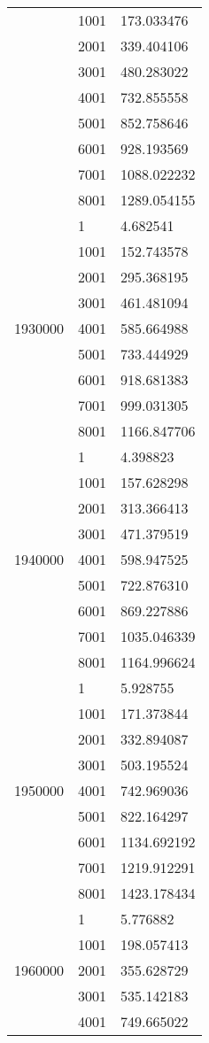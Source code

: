 \begin{table}[htb!]
\begin{tabular}{lll}
 & 1001 & 173.033476 \\
 & 2001 & 339.404106 \\
 & 3001 & 480.283022 \\
 & 4001 & 732.855558 \\
 & 5001 & 852.758646 \\
 & 6001 & 928.193569 \\
 & 7001 & 1088.022232 \\
 & 8001 & 1289.054155 \\
\multirow[c]{9}{*}{1930000} & 1 & 4.682541 \\
 & 1001 & 152.743578 \\
 & 2001 & 295.368195 \\
 & 3001 & 461.481094 \\
 & 4001 & 585.664988 \\
 & 5001 & 733.444929 \\
 & 6001 & 918.681383 \\
 & 7001 & 999.031305 \\
 & 8001 & 1166.847706 \\
\multirow[c]{9}{*}{1940000} & 1 & 4.398823 \\
 & 1001 & 157.628298 \\
 & 2001 & 313.366413 \\
 & 3001 & 471.379519 \\
 & 4001 & 598.947525 \\
 & 5001 & 722.876310 \\
 & 6001 & 869.227886 \\
 & 7001 & 1035.046339 \\
 & 8001 & 1164.996624 \\
\multirow[c]{9}{*}{1950000} & 1 & 5.928755 \\
 & 1001 & 171.373844 \\
 & 2001 & 332.894087 \\
 & 3001 & 503.195524 \\
 & 4001 & 742.969036 \\
 & 5001 & 822.164297 \\
 & 6001 & 1134.692192 \\
 & 7001 & 1219.912291 \\
 & 8001 & 1423.178434 \\
\multirow[c]{9}{*}{1960000} & 1 & 5.776882 \\
 & 1001 & 198.057413 \\
 & 2001 & 355.628729 \\
 & 3001 & 535.142183 \\
 & 4001 & 749.665022 \\

\end{tabular}
\end{table}
